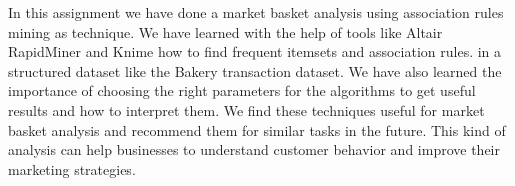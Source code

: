 \label{chap:conclusion}

In this assignment we have done a market basket analysis using association rules mining as technique.
We have learned with the help of tools like Altair RapidMiner and Knime how to find frequent itemsets and association rules.
in a structured dataset like the Bakery transaction dataset. We have also learned the importance of choosing the
right parameters for the algorithms to get useful results and how to interpret them. We find these techniques useful
for market basket analysis and recommend them for similar tasks in the future. This kind of analysis can help businesses
to understand customer behavior and improve their marketing strategies.